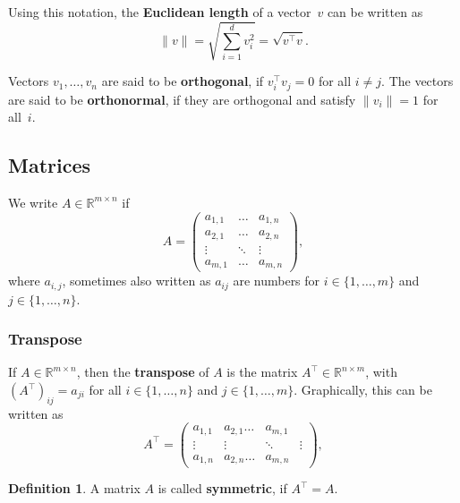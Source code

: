 \documentclass[
  a4paper,
]{article}
\theoremstyle{definition}
\newtheorem{definition}{Definition}[section]
\theoremstyle{definition}
\theoremstyle{definition}
\theoremstyle{definition}
\theoremstyle{remark}
\begin{document}
Using this notation, the \textbf{Euclidean length} of a vector~\(v\)
can be written as
\begin{equation*}
  \|v\|
  = \sqrt{\sum_{i=1}^d v_i^2}
  = \sqrt{v^\top v}.
\end{equation*}

Vectors \(v_1, \ldots, v_n\) are said to be \textbf{orthogonal},
if \(v_i^\top v_j = 0\) for all \(i \neq j\). The vectors are said to be
\textbf{orthonormal}, if they are orthogonal and satisfy \(\|v_i\| = 1\)
for all~\(i\).

\hypertarget{matrix-rules}{%
\subsection{Matrices}\label{matrix-rules}}

We write \(A \in \mathbb{R}^{m\times n}\) if
\begin{equation*}
  A
  = \begin{pmatrix}
    a_{1,1} & \ldots  & a_{1,n}\\
    a_{2,1} & \ldots  & a_{2,n}\\
    \vdots & \ddots  & \vdots\\
    a_{m,1} & \ldots  & a_{m,n}
  \end{pmatrix},
\end{equation*}
where \(a_{i,j}\), sometimes also written as \(a_{ij}\) are numbers
for \(i \in \{1, \ldots, m\}\) and \(j \in \{1, \ldots, n\}\).

\hypertarget{transpose}{%
\subsubsection{Transpose}\label{transpose}}

If \(A \in \mathbb{R}^{m\times n}\), then the \textbf{transpose} of \(A\) is the matrix
\(A^\top \in \mathbb{R}^{n\times m}\), with \((A^\top)_{ij} = a_{ji}\) for all \(i \in \{1, \ldots, n\}\) and \(j \in \{1, \ldots, m\}\). Graphically,
this can be written as
\begin{equation*}
  A^\top
  = \begin{pmatrix}
    a_{1,1} & a_{2,1} \ldots  & a_{m,1}\\
    \vdots & \vdots & \ddots  & \vdots\\
    a_{1,n} & a_{2,n} \ldots  & a_{m,n}
  \end{pmatrix},
\end{equation*}

\begin{definition}
A matrix \(A\) is called \textbf{symmetric}, if \(A^\top = A\).
\end{definition}
\end{document}
